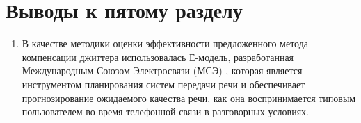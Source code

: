 \section{Выводы к пятому разделу} \label{sect:concl4}
\begin{enumerate}
 \item %
 В качестве методики оценки эффективности предложенного метода компенсации джиттера использовалась Е-модель, разработанная Международным Союзом Электросвязи (МСЭ) \cite{G107}, 
 которая является инструментом планирования систем передачи речи и обеспечивает прогнозирование ожидаемого качества речи, 
 как она воспринимается типовым пользователем во время телефонной связи в разговорных условиях.
 

\end{enumerate}
